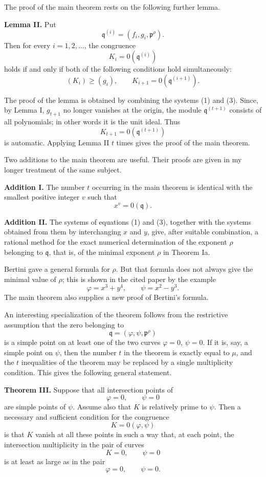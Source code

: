 \documentclass[12pt]{article}
\begin{document}
The proof of the main theorem rests on the following further lemma.

\textbf{Lemma II.} Put
\[
  \mathfrak q^{(i)}=(f_i,g_i,\mathfrak p^{\rho}).
\]
Then for every \(i=1,2,\ldots\), the congruence
\[
  K_i=0(\mathfrak q^{(i)})
\]
holds if and only if both of the following conditions hold simultaneously:
\[
  (K_i)\ge (g_i),
  \qquad
  K_{i+1}=0(\mathfrak q^{(i+1)}).
\]

The proof of the lemma is obtained by combining the systems (1) and (3). Since, by Lemma I, \(g_{t+1}\) no longer vanishes at the origin, the module \(\mathfrak q^{(t+1)}\) consists of all polynomials; in other words it is the unit ideal. Thus
\[
  K_{t+1}=0(\mathfrak q^{(t+1)})
\]
is automatic. Applying Lemma II \(t\) times gives the proof of the main theorem.

Two additions to the main theorem are useful. Their proofs are given in my longer treatment of the same subject.

\textbf{Addition I.} The number \(t\) occurring in the main theorem is identical with the smallest positive integer \(v\) such that
\[
  x^v=0(\mathfrak q).
\]

\textbf{Addition II.} The systems of equations (1) and (3), together with the systems obtained from them by interchanging \(x\) and \(y\), give, after suitable combination, a rational method for the exact numerical determination of the exponent \(\rho\) belonging to \(\mathfrak q\), that is, of the minimal exponent \(\rho\) in Theorem Ia.

Bertini gave a general formula for \(\rho\). But that formula does not always give the minimal value of \(\rho\); this is shown in the cited paper by the example
\[
  \varphi=x^3+y^4,
  \qquad
  \psi=x^2-y^3.
\]
The main theorem also supplies a new proof of Bertini's formula.

An interesting specialization of the theorem follows from the restrictive assumption that the zero belonging to
\[
  \mathfrak q=(\varphi,\psi,\mathfrak p^{\rho})
\]
is a simple point on at least one of the two curves \(\varphi=0\), \(\psi=0\). If it is, say, a simple point on \(\psi\), then the number \(t\) in the theorem is exactly equal to \(\mu\), and the \(t\) inequalities of the theorem may be replaced by a single multiplicity condition. This gives the following general statement.

\textbf{Theorem III.} Suppose that all intersection points of
\[
  \varphi=0,
  \qquad
  \psi=0
\]
are simple points of \(\psi\). Assume also that \(K\) is relatively prime to \(\psi\). Then a necessary and sufficient condition for the congruence
\[
  K=0(\varphi,\psi)
\]
is that \(K\) vanish at all these points in such a way that, at each point, the intersection multiplicity in the pair of curves
\[
  K=0,
  \qquad
  \psi=0
\]
is at least as large as in the pair
\[
  \varphi=0,
  \qquad
  \psi=0.
\]
\end{document}
